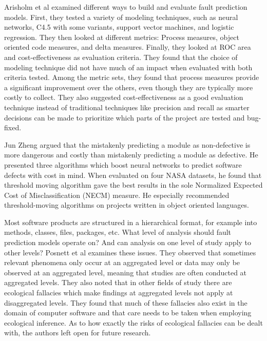 \documentclass{sig-alternate-05-2015}
\begin{document}
Arisholm et al \cite{Arisholm} examined different ways to build and evaluate fault prediction models. First, they tested a variety of modeling techniques, such as neural networks, C4.5 with some variants, support vector machines, and logistic regression. They then looked at different metrics:  Process measures, object oriented code measures, and delta measures. Finally, they looked at ROC area and cost-effectiveness as evaluation criteria. They found that the choice of modeling technique did not have much of an impact when evaluated with both criteria tested. Among the metric sets, they found that process measures provide a significant improvement over the others, even though they are typically more costly to collect.  They also suggested cost-effectiveness as a good evaluation technique instead of traditional techniques like precision and recall as smarter decisions can be made to prioritize which parts of the project are tested and bug-fixed.

Jun Zheng \cite{zheng2010} argued that the mistakenly predicting a module as non-defective is more dangerous and costly than mistakenly predicting a module as defective. He presented three algorithms which boost neural networks to predict software defects with cost in mind. When evaluated on four NASA datasets, he found that threshold moving algorithm gave the best results in the sole Normalized Expected Cost of Misclassification (NECM) measure. He especially recommended threshold-moving algorithms on projects written in object oriented languages.

Most software products are structured in a hierarchical format, for example into methods, classes, files, packages, etc. What level of analysis should fault prediction models operate on? And can analysis on one level of study apply to other levels? Posnett et al \cite{Posnett} examines these issues. They observed that sometimes relevant phenomena only occur at an aggregated level or data may only be observed at an aggregated level, meaning that studies are often conducted at aggregated levels. They also noted that in other fields of study there are ecological fallacies which make findings at aggregated levels not apply at disaggregated levels. They found that much of these fallacies also exist in the domain of computer software and that care needs to be taken when employing ecological inference. As to how exactly the risks of ecological fallacies can be dealt with, the authors left open for future research.
\end{document}

